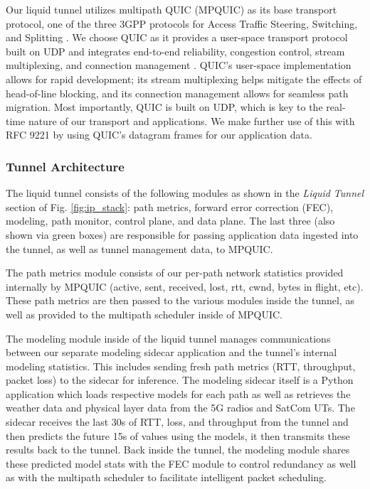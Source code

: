 \documentclass[sigconf,nonacm]{acmart}
\begin{document}
Our liquid tunnel utilizes multipath QUIC (MPQUIC) as its base transport protocol, one of the three 3GPP protocols for Access Traffic Steering, Switching, and Splitting \cite{10.1109/MCOMSTD.0006.2200056, 3gpp2024atsss}. We choose QUIC as it provides a user-space transport protocol built on UDP and integrates end-to-end reliability, congestion control, stream multiplexing, and connection management \cite{langley_quic_2017}. QUIC's user-space implementation allows for rapid development; its stream multiplexing helps mitigate the effects of head-of-line blocking, and its connection management allows for seamless path migration. Most importantly, QUIC is built on UDP, which is key to the real-time nature of our transport and applications. We make further use of this with RFC 9221 \cite{rfc9221} by using QUIC's datagram frames for our application data. 

\subsubsection{Tunnel Architecture}

The liquid tunnel consists of the following modules as shown in the \textit{Liquid Tunnel} section of Fig. \eqref{fig:ip_stack}: path metrics, forward error correction (FEC), modeling, path monitor, control plane, and data plane. The last three (also shown via green boxes) are responsible for passing application data ingested into the tunnel, as well as tunnel management data, to MPQUIC. 

The path metrics module consists of our per-path network statistics provided internally by MPQUIC (active, sent, received, lost, rtt, cwnd, bytes in flight, etc). These path metrics are then passed to the various modules inside the tunnel, as well as provided to the multipath scheduler inside of MPQUIC. 

The modeling module inside of the liquid tunnel manages communications between our separate modeling sidecar application and the tunnel's internal modeling statistics. This includes sending fresh path metrics (RTT, throughput, packet loss) to the sidecar for inference. The modeling sidecar itself is a Python application which loads respective models for each path as well as retrieves the weather data and physical layer data from the 5G radios and SatCom UTs. The sidecar receives the last 30s of RTT, loss, and throughput from the tunnel and then predicts the future 15s of values using the models, it then transmits these results back to the tunnel. Back inside the tunnel, the modeling module shares these predicted model stats with the FEC module to control redundancy as well as with the multipath scheduler to facilitate intelligent packet scheduling.
\end{document}
